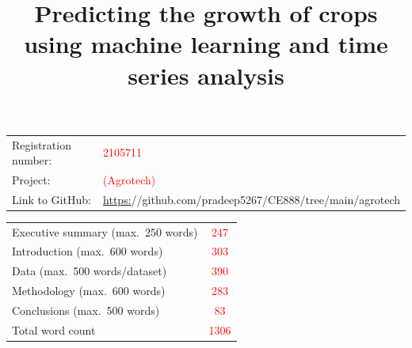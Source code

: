 \documentclass{article}
\title{Predicting the growth of crops using machine learning and time series analysis}
\begin{document}
\maketitle

\begin{table}[h]
    \centering
    \begin{tabular}{ll}
        Registration number: & \textcolor{red}{2105711}\\
        Project: & \textcolor{red}{(Agrotech)}\\
        Link to GitHub: & \url{https:}//github.com/pradeep5267/CE888/tree/main/agrotech
    \end{tabular}
\end{table}



\begin{table}[h]
    \centering
    \begin{tabular}{lc}
        Executive summary (max.\ 250 words) & \textcolor{red}{247}\\
        Introduction (max.\ 600 words) & \textcolor{red}{303}\\
        Data (max.\ 500 words/dataset) & \textcolor{red}{390}\\
        Methodology (max.\ 600 words) & \textcolor{red}{283}\\
        Conclusions (max.\ 500 words) & \textcolor{red}{83}\\
        \hline
        Total word count & \textcolor{red}{1306}\\
    \end{tabular}
\end{table}

\tableofcontents

\clearpage
\end{document}
